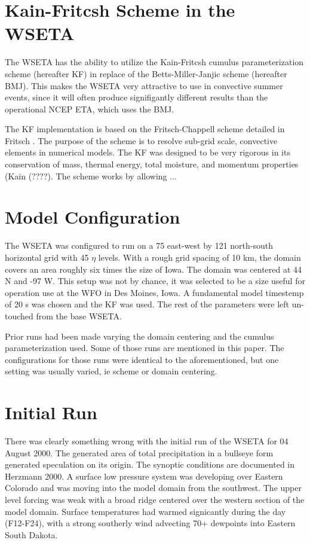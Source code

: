 \documentclass{article}
\begin{document}
\begin{multicols}{2}
\section{Kain-Fritcsh Scheme in the WSETA}
The WSETA has the ability to utilize the Kain-Fritcsh cumulus parameterization scheme (hereafter KF) in replace of the Betts-Miller-Janjic scheme (hereafter BMJ).  This makes the WSETA very attractive to use in convective summer events, since it will often produce signifigantly different results than the operational NCEP ETA, which uses the BMJ.

The KF implementation is based on the Fritsch-Chappell scheme detailed in Fritsch .  The purpose of the scheme is to resolve sub-grid scale, convective elements in numerical models.  The KF was designed to be very rigorous in its conservation of mass, thermal energy, total moisture, and momentum properties (Kain (\etal ????).  The scheme works by allowing ...

\section{Model Configuration}
The WSETA was configured to run on a 75 east-west by 121 north-south horizontal grid with 45 $\eta$ levels. With a rough grid spacing of 10 km, the domain covers an area roughly six times the size of Iowa.  The domain was centered at 44 \deg N and -97 \deg W.  This setup was not by chance, it was selected to be a size useful for operation use at the WFO in Des Moines, Iowa.  A fundamental model timestemp of 20 s was chosen and the KF was used.  The rest of the parameters were left un-touched from the base WSETA.

Prior runs had been made varying the domain centering and the cumulus parameterization used.  Some of those runs are mentioned in this paper.  The configurations for those runs were identical to the aforementioned, but one setting was usually varied, ie scheme or domain centering.

\section{Initial Run}
There was clearly something wrong with the initial run of the WSETA for 04 August 2000.  The generated area of total precipitation in a bullseye form generated speculation on its origin.  The synoptic conditions are documented in Herzmann 2000.  A surface low pressure system was developing over Eastern Colorado and was moving into the model domain from the southwest.  The upper level forcing was weak with a broad ridge centered over the western section of the model domain.  Surface temperatures had warmed signicantly during the day (F12-F24), with a strong southerly wind advecting 70+ \degf dewpoints into Eastern South Dakota.


\end{multicols}
\end{document}
